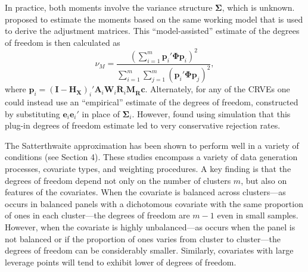 \documentclass[12pt]{article}\usepackage[]{graphicx}\usepackage[]{color}
\newcommand{\bm}{\mathbf}
\newcommand{\bs}{\boldsymbol}
\begin{document}
In practice, both moments involve the variance structure $\bs\Sigma$, which is unknown. 
\citet{Bell2002bias} proposed to estimate the moments based on the same working model that is used to derive the adjustment matrices. 
This ``model-assisted'' estimate of the degrees of freedom is then calculated as 
\begin{equation}
\label{eq:nu_model}
\nu_{M} = \frac{\left(\sum_{i=1}^m \bm{p}_i' \bs\Phi \bm{p}_i\right)^2}{\sum_{i=1}^m \sum_{j=1}^m \left(\bm{p}_i' \bs\Phi \bm{p}_j\right)^2},
\end{equation}
where $\bm{p}_i = \left(\bm{I} - \bm{H_X}\right)_i'\bm{A}_i \bm{W}_i\bm{\ddot{R}}_i\bm{M_{\ddot{R}}} \bm{c}$.
\todo{Can we use $\bm{H_{\ddot{U}}}$ here instead?} 
Alternately, for any of the CRVEs one could instead use an ``empirical'' estimate of the degrees of freedom, constructed by substituting $\bm{e}_i \bm{e}_i'$ in place of $\bs\Sigma_i$. 
However, \citet{Bell2002bias} found using simulation that this plug-in degrees of freedom estimate led to very conservative rejection rates. 

The \citet{Bell2002bias} Satterthwaite approximation has been shown to perform well in a variety of conditions (see Section 4). 
These studies encompass a variety of data generation processes, covariate types, and weighting procedures. 
A key finding is that the degrees of freedom depend not only on the number of clusters $m$, but also on features of the covariates. 
When the covariate is balanced across clusters---as occurs in balanced panels with a dichotomous covariate with the same proportion of ones in each cluster---the degrees of freedom are $m - 1$ even in small samples. 
However, when the covariate is highly unbalanced---as occurs when the panel is not balanced or if the proportion of ones varies from cluster to cluster---the degrees of freedom can be considerably smaller. 
Similarly, covariates with large leverage points will tend to exhibit lower of degrees of freedom. 
\end{document}
